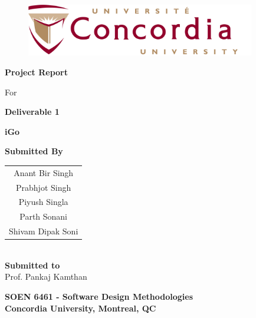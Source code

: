 \documentclass[a4paper,12pt]{article}
\begin{document}
\begin{titlepage}

\begin{center}
\vspace*{-1.2in}
\begin{figure}[htb]
\begin{center}
\includegraphics[width=10cm]{Concordia_logo.png}
\end{center}
\end{figure}
\begin{Large}
\vspace*{0.3in}
\textbf{Project Report} \\
\end{Large}
\vspace*{0.1in}
\begin{Large}
For\\
\end{Large}
\vspace*{0.1in}

\begin{Large}
\textbf{Deliverable 1} \\
\end{Large}
\vspace*{0.1in}

\begin{Large}
\textbf{iGo} \\
\end{Large}
\vspace*{0.3in}

\begin{large}
\textbf{Submitted By} \\
\vspace*{0.1in}
\begin{tabular}{c}
  Anant Bir Singh\\
  Prabhjot Singh\\
  Piyush Singla\\
  Parth Sonani\\
  Shivam Dipak Soni\\
\end{tabular}\\
\vspace*{0.4in}
\textbf{Submitted to}\\
\vspace*{0.1in}
Prof. Pankaj Kamthan\\
\vspace*{0.3in}

\begin{Large}
\textbf{SOEN 6461 - Software Design Methodologies} \\
\vspace*{0.2in}
\textbf{Concordia University, Montreal, QC}
\end{Large}

\end{large}
\end{center}
\end{titlepage}
\end{document}
